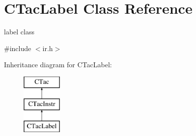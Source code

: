 \hypertarget{classCTacLabel}{\section{C\-Tac\-Label Class Reference}
\label{classCTacLabel}
}


label class  




{\ttfamily \#include $<$ir.\-h$>$}

Inheritance diagram for C\-Tac\-Label\-:\begin{figure}[H]
\begin{center}
\leavevmode
\includegraphics[height=3.000000cm]{classCTacLabel}
\end{center}
\end{figure}

